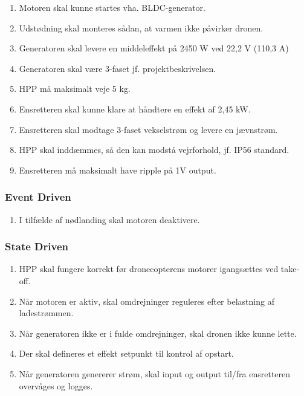 \begin{enumerate}[label=2.1.1.\arabic*]
\item Motoren skal kunne startes vha. BLDC-generator.
\item Udstødning skal monteres sådan, at varmen ikke påvirker dronen.
\item Generatoren skal levere en middeleffekt på 2450 W ved 22,2 V (110,3 A)
\item Generatoren skal være 3-faset jf. projektbeskrivelsen.
\item HPP må maksimalt veje 5 kg.
\item Ensretteren skal kunne klare at håndtere en effekt af 2,45 kW.
\item Ensretteren skal modtage 3-faset vekselstrøm og levere en jævnstrøm.
\item HPP skal inddæmmes, så den kan modstå vejrforhold, jf. IP56 standard.
\item Ensretteren må maksimalt have ripple på 1V output.
\end{enumerate}

\subsubsection{Event Driven}
\label{sec:kravspecifikation-2}

\begin{enumerate}[label=2.1.2.\arabic*]
\item I tilfælde af nødlanding skal motoren deaktivere. 
\end{enumerate}

\subsubsection{State Driven}
\label{sec:kravspecifikation-3}

\begin{enumerate}[label=2.1.3.\arabic*]
\item HPP skal fungere korrekt før dronecopterens motorer igangsættes ved take-off.
\item Når motoren er aktiv, skal omdrejninger reguleres efter belastning af ladestrømmen.
\item Når generatoren ikke er i fulde omdrejninger, skal dronen ikke kunne lette.
\item Der skal defineres et effekt setpunkt til kontrol af opstart.
\item Når generatoren genererer strøm, skal input og output til/fra ensretteren overvåges og logges.
\end{enumerate}

